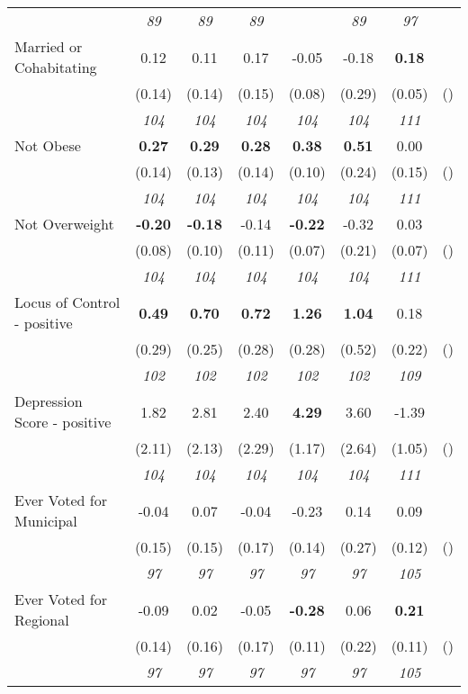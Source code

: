 \begin{tabular}{l c c c c c c c}
& \textit{ 89 } & \textit{ 89 } & \textit{ 89 } & & \textit{ 89 } & \textit{ 97 } & \\
Married or Cohabitating & 0.12 & 0.11 & 0.17 & -0.05 & -0.18 & \textbf{0.18} & \\
& (0.14) & (0.14) & (0.15) & (0.08) & (0.29) & (0.05) & () \\
& \textit{ 104 } & \textit{ 104 } & \textit{ 104 } & \textit{ 104 } & \textit{ 104 } & \textit{ 111 } & \\
Not Obese & \textbf{ 0.27 } & \textbf{ 0.29 } & \textbf{ 0.28 } & \textbf{0.38} & \textbf{0.51} & 0.00 & \\
& (0.14) & (0.13) & (0.14) & (0.10) & (0.24) & (0.15) & () \\
& \textit{ 104 } & \textit{ 104 } & \textit{ 104 } & \textit{ 104 } & \textit{ 104 } & \textit{ 111 } & \\
Not Overweight & \textbf{ -0.20 } & \textbf{ -0.18 } & -0.14 & \textbf{-0.22} & -0.32 & 0.03 & \\
& (0.08) & (0.10) & (0.11) & (0.07) & (0.21) & (0.07) & () \\
& \textit{ 104 } & \textit{ 104 } & \textit{ 104 } & \textit{ 104 } & \textit{ 104 } & \textit{ 111 } & \\
Locus of Control - positive & \textbf{ 0.49 } & \textbf{ 0.70 } & \textbf{ 0.72 } & \textbf{1.26} & \textbf{1.04} & 0.18 & \\
& (0.29) & (0.25) & (0.28) & (0.28) & (0.52) & (0.22) & () \\
& \textit{ 102 } & \textit{ 102 } & \textit{ 102 } & \textit{ 102 } & \textit{ 102 } & \textit{ 109 } & \\
Depression Score - positive & 1.82 & 2.81 & 2.40 & \textbf{4.29} & 3.60 & -1.39 & \\
& (2.11) & (2.13) & (2.29) & (1.17) & (2.64) & (1.05) & () \\
& \textit{ 104 } & \textit{ 104 } & \textit{ 104 } & \textit{ 104 } & \textit{ 104 } & \textit{ 111 } & \\
Ever Voted for Municipal & -0.04 & 0.07 & -0.04 & -0.23 & 0.14 & 0.09 & \\
& (0.15) & (0.15) & (0.17) & (0.14) & (0.27) & (0.12) & () \\
& \textit{ 97 } & \textit{ 97 } & \textit{ 97 } & \textit{ 97 } & \textit{ 97 } & \textit{ 105 } & \\
Ever Voted for Regional & -0.09 & 0.02 & -0.05 & \textbf{-0.28} & 0.06 & \textbf{0.21} & \\
& (0.14) & (0.16) & (0.17) & (0.11) & (0.22) & (0.11) & () \\
& \textit{ 97 } & \textit{ 97 } & \textit{ 97 } & \textit{ 97 } & \textit{ 97 } & \textit{ 105 } & \\
\bottomrule
\end{tabular}

